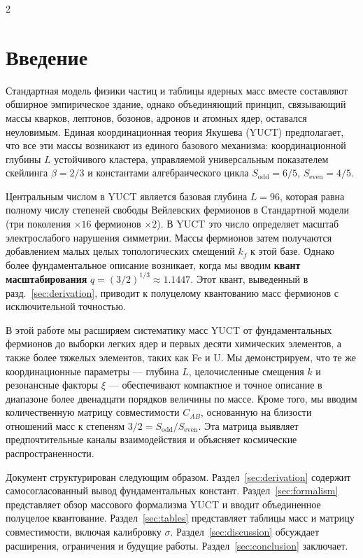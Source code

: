\documentclass[11pt,a4paper]{article}
\begin{document}
	\vspace{0.4cm}
	
	\begin{multicols}{2}
		
		\section{Введение}
		
		Стандартная модель физики частиц и таблицы ядерных масс вместе составляют обширное эмпирическое здание, однако объединяющий принцип, связывающий массы кварков, лептонов, бозонов, адронов и атомных ядер, оставался неуловимым. Единая координационная теория Якушева (YUCT) предполагает, что все эти массы возникают из единого базового механизма: координационной глубины \(L\) устойчивого кластера, управляемой универсальным показателем скейлинга \(\beta = 2/3\) и константами алгебраического цикла \(S_{\mathrm{odd}}=6/5\), \(S_{\mathrm{even}}=4/5\).
		
		Центральным числом в YUCT является базовая глубина \(L = 96\), которая равна полному числу степеней свободы Вейлевских фермионов в Стандартной модели (три поколения $\times 16$ фермионов $\times 2$). В YUCT это число определяет масштаб электрослабого нарушения симметрии. Массы фермионов затем получаются добавлением малых целых топологических смещений \(k_f\) к этой базе. Однако более фундаментальное описание возникает, когда мы вводим \textbf{квант масштабирования} \(q = (3/2)^{1/3} \approx 1.1447\). Этот квант, выведенный в разд.~\ref{sec:derivation}, приводит к полуцелому квантованию масс фермионов с исключительной точностью.
		
		В этой работе мы расширяем систематику масс YUCT от фундаментальных фермионов до выборки легких ядер и первых десяти химических элементов, а также более тяжелых элементов, таких как Fe и U. Мы демонстрируем, что те же координационные параметры — глубина \(L\), целочисленные смещения \(k\) и резонансные факторы \(\xi\) — обеспечивают компактное и точное описание в диапазоне более двенадцати порядков величины по массе. Кроме того, мы вводим количественную матрицу совместимости \(C_{AB}\), основанную на близости отношений масс к степеням \(3/2 = S_{\mathrm{odd}}/S_{\mathrm{even}}\). Эта матрица выявляет предпочтительные каналы взаимодействия и объясняет космические распространенности.
		
		Документ структурирован следующим образом. Раздел~\ref{sec:derivation} содержит самосогласованный вывод фундаментальных констант. Раздел~\ref{sec:formalism} представляет обзор массового формализма YUCT и вводит объединенное полуцелое квантование. Раздел~\ref{sec:tables} представляет таблицы масс и матрицу совместимости, включая калибровку \(\sigma\). Раздел~\ref{sec:discussion} обсуждает расширения, ограничения и будущие работы. Раздел~\ref{sec:conclusion} заключает.
		

\end{multicols}
\end{document}
